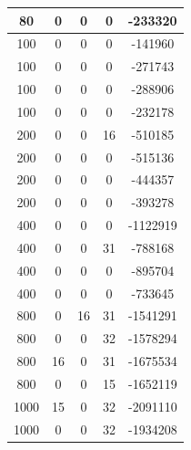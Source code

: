 \documentclass[a4paper]{article}
\begin{document}
\begin{table}[H]
\begin{minipage}[t]{10cm}
\begin{tabular}{|c|c|c|c|c|}
80            & 0              & 0                   & 0                & -233320      \\ \hline
100           & 0              & 0                   & 0                & -141960      \\ \hline
100           & 0              & 0                   & 0                & -271743      \\ \hline
100           & 0              & 0                   & 0                & -288906      \\ \hline
100           & 0              & 0                   & 0                & -232178      \\ \hline
200           & 0              & 0                   & 16               & -510185      \\ \hline
200           & 0              & 0                   & 0                & -515136      \\ \hline
200           & 0              & 0                   & 0                & -444357      \\ \hline
200           & 0              & 0                   & 0                & -393278      \\ \hline
400           & 0              & 0                   & 0                & -1122919     \\ \hline
400           & 0              & 0                   & 31               & -788168      \\ \hline
400           & 0              & 0                   & 0                & -895704      \\ \hline
400           & 0              & 0                   & 0                & -733645      \\ \hline
800           & 0              & 16                  & 31               & -1541291     \\ \hline
800           & 0              & 0                   & 32               & -1578294     \\ \hline
800           & 16             & 0                   & 31               & -1675534     \\ \hline
800           & 0              & 0                   & 15               & -1652119     \\ \hline
1000          & 15             & 0                   & 32               & -2091110     \\ \hline
1000          & 0              & 0                   & 32               & -1934208     \\ \hline

\end{tabular}
\end{minipage}
\end{table}
\end{document}
